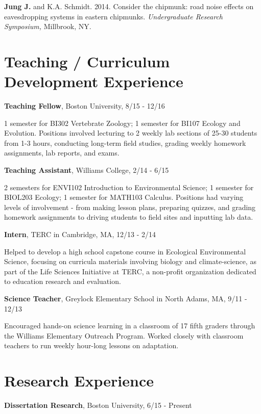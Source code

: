 \documentclass[margin,line]{res}
\begin{document}
\begin{resume}
\vspace{-.25cm}
{\bf Jung J.} and K.A. Schmidt. {2014.} {Consider the chipmunk: road noise effects on eavesdropping systems in eastern chipmunks.} {\it Undergraduate Research Symposium,} {Millbrook, NY. }

\section{\sc Teaching / Curriculum Development Experience}
{\bf Teaching Fellow},  Boston University, 8/15 - 12/16 

\vspace{-.43cm}
{1 semester for BI302 Vertebrate Zoology; 1 semester for BI107 Ecology and Evolution. Positions involved lecturing to 2 weekly lab sections of 25-30 students from 1-3 hours, conducting long-term field studies, grading weekly homework assignments, lab reports, and exams. }

\vspace{-.1cm}
{\bf Teaching Assistant},  Williams College, 2/14 - 6/15 

\vspace{-.43cm}
{2 semesters for ENVI102 Introduction to Environmental Science; 1 semester for BIOL203 Ecology; 1 semester for MATH103 Calculus. Positions had varying levels of involvement - from making lesson plans, preparing quizzes, and grading homework assignments to driving students to field sites and inputting lab data.}

\vspace{-.1cm}
{\bf Intern},  TERC in Cambridge, MA, 12/13 - 2/14

\vspace{-.43cm}
{Helped to develop a high school capstone course in Ecological Environmental Science, focusing on curricula materials involving biology and climate-science, as part of the Life Sciences Initiative at TERC, a non-profit organization dedicated to education research and evaluation. }

\vspace{-.1cm}
{\bf Science Teacher},  Greylock Elementary School in North Adams, MA, 9/11 - 12/13

\vspace{-.43cm}
{Encouraged hands-on science learning in a classroom of 17 fifth graders through the Williams Elementary Outreach Program. Worked closely with classroom teachers to run weekly hour-long lessons on adaptation. }

\section{\sc Research Experience}
{\bf Dissertation Research},  Boston University, 6/15 - Present


\end{resume}
\end{document}
